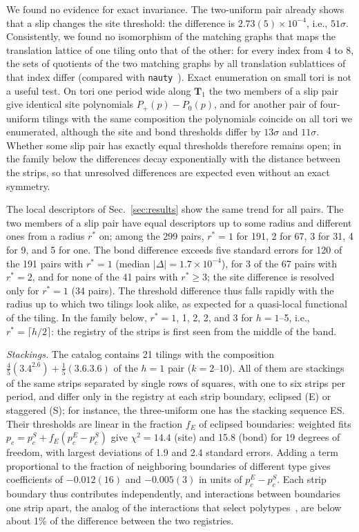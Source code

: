 \documentclass[pre,twocolumn,superscriptaddress,longbibliography,floatfix]{revtex4-2}
\newcommand{\pc}{p_c}
\begin{document}
We found no evidence for exact invariance. The two-uniform pair already shows that a slip changes the site threshold: the difference is $2.73(5)\times10^{-4}$, i.e., $51\sigma$. Consistently, we found no isomorphism of the matching graphs that maps the translation lattice of one tiling onto that of the other: for every index from 4 to 8, the sets of quotients of the two matching graphs by all translation sublattices of that index differ (compared with \texttt{nauty}~\cite{McKayPiperno14}). Exact enumeration on small tori is not a useful test. On tori one period wide along $\mathbf T_1$ the two members of a slip pair give identical site polynomials $P_+(p)-P_0(p)$, and for another pair of four-uniform tilings with the same composition the polynomials coincide on all tori we enumerated, although the site and bond thresholds differ by $13\sigma$ and $11\sigma$. Whether some slip pair has exactly equal thresholds therefore remains open; in the family below the differences decay exponentially with the distance between the strips, so that unresolved differences are expected even without an exact symmetry.

The local descriptors of Sec.~\ref{sec:results} show the same trend for all pairs. The two members of a slip pair have equal descriptors up to some radius and different ones from a radius $r^\ast$ on; among the 299 pairs, $r^\ast=1$ for 191, 2 for 67, 3 for 31, 4 for 9, and 5 for one. The bond difference exceeds five standard errors for 120 of the 191 pairs with $r^\ast=1$ (median $|\Delta|=1.7\times10^{-4}$), for 3 of the 67 pairs with $r^\ast=2$, and for none of the 41 pairs with $r^\ast\ge3$; the site difference is resolved only for $r^\ast=1$ (34 pairs). The threshold difference thus falls rapidly with the radius up to which two tilings look alike, as expected for a quasi-local functional of the tiling. In the family below, $r^\ast=1$, 1, 2, 2, and 3 for $h=1$--5, i.e., $r^\ast=\lceil h/2\rceil$: the registry of the strips is first seen from the middle of the band.

\textit{Stackings.} The catalog contains 21 tilings with the composition $\tfrac45(3.4^2.6)+\tfrac15(3.6.3.6)$ of the $h=1$ pair ($k=2$--10). All of them are stackings of the same strips separated by single rows of squares, with one to six strips per period, and differ only in the registry at each strip boundary, eclipsed (E) or staggered (S); for instance, the three-uniform one has the stacking sequence ES. Their thresholds are linear in the fraction $f_E$ of eclipsed boundaries: weighted fits $\pc=\pc^S+f_E(\pc^E-\pc^S)$ give $\chi^2=14.4$ (site) and 15.8 (bond) for 19 degrees of freedom, with largest deviations of 1.9 and 2.4 standard errors. Adding a term proportional to the fraction of neighboring boundaries of different type gives coefficients of $-0.012(16)$ and $-0.005(3)$ in units of $\pc^E-\pc^S$. Each strip boundary thus contributes independently, and interactions between boundaries one strip apart, the analog of the interactions that select polytypes~\cite{VermaKrishna66}, are below about 1\% of the difference between the two registries.
\end{document}
